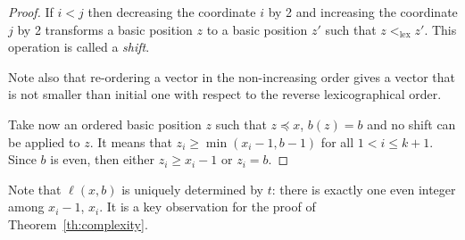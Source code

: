 \documentclass{article}
\theoremstyle{definition}
\def\lex{\mathrel{<_{\text{lex}}}}
\begin{document}
\begin{proof}
  If $i<j$ then decreasing the coordinate $i$ by 2 and increasing the coordinate $j$ by 2 transforms a basic position $z$ to a basic position $z'$ such that $z\lex z'$. This operation is  called  a \emph{shift}.

Note also that re-ordering a vector in the non-increasing order gives a vector that is not smaller than initial one with respect to the reverse lexicographical order.
  
Take now  an ordered basic position  $z$ such that $z\preceq x$, $b(z) = b$ and no shift can be applied to $z$. It means that $z_i\geq \min(x_i-1, b-1)$ for all $1<i\leq k+1$. Since  $b$ is even, then either $z_i\geq x_i-1$ or $z_i=b$.
\end{proof}

Note that $\ell(x,b)$ is uniquely determined by  $t$: there is exactly one even integer among $x_i-1$, $x_i$. It is a key observation for the proof of Theorem~\ref{th:complexity}.
\end{document}
